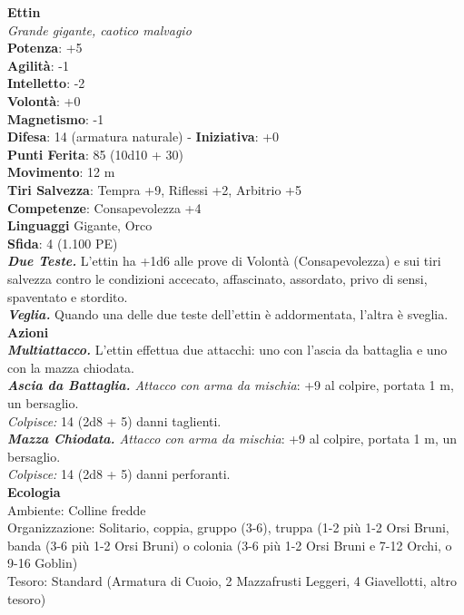 \begin{multicols}{2}
\medskip\textbf{Ettin}\\
\emph{Grande gigante, caotico malvagio}\\
\textbf{Potenza}: +5\\
\textbf{Agilità}: -1\\
\textbf{Intelletto}: -2\\
\textbf{Volontà}: +0\\
\textbf{Magnetismo}: -1\\
\textbf{Difesa}: 14 (armatura naturale) - \textbf{Iniziativa}: +0\\
\textbf{Punti Ferita}: 85 (10d10 + 30)\\
\textbf{Movimento}: 12 m\\
\textbf{Tiri Salvezza}: Tempra +9, Riflessi +2, Arbitrio +5\\
\textbf{Competenze}: Consapevolezza +4\\
\textbf{Linguaggi} Gigante, Orco\\
\textbf{Sfida}: 4 (1.100 PE)\smallskip\\
\emph{\textbf{Due Teste.}} L'ettin ha +1d6 alle prove di Volontà (Consapevolezza) e sui tiri salvezza contro le condizioni accecato, affascinato, assordato, privo di sensi, spaventato e stordito. \\
\emph{\textbf{Veglia.}} Quando una delle due teste dell'ettin è addormentata, l'altra è sveglia.\\
\smallskip\textbf{Azioni} \\
\emph{\textbf{Multiattacco.}} L'ettin effettua due attacchi: uno con l'ascia da battaglia e uno con la mazza chiodata.\\
\emph{\textbf{Ascia da Battaglia.} Attacco con arma da mischia}: +9 al colpire, portata 1 m, un bersaglio.\\
\emph{Colpisce:} 14 (2d8 + 5) danni taglienti.\\
\emph{\textbf{Mazza Chiodata.} Attacco con arma da mischia}: +9 al colpire, portata 1 m, un bersaglio.\\
\emph{Colpisce:} 14 (2d8 + 5) danni perforanti.\\
\textbf{Ecologia}\\
Ambiente: Colline fredde\\
Organizzazione: Solitario, coppia, gruppo (3-6), truppa (1-2 più 1-2 Orsi Bruni, banda (3-6 più 1-2 Orsi Bruni) o colonia (3-6 più 1-2 Orsi Bruni e 7-12 Orchi, o 9-16 Goblin)\\
Tesoro: Standard (Armatura di Cuoio, 2 Mazzafrusti Leggeri, 4 Giavellotti, altro tesoro)\\

\end{multicols}
